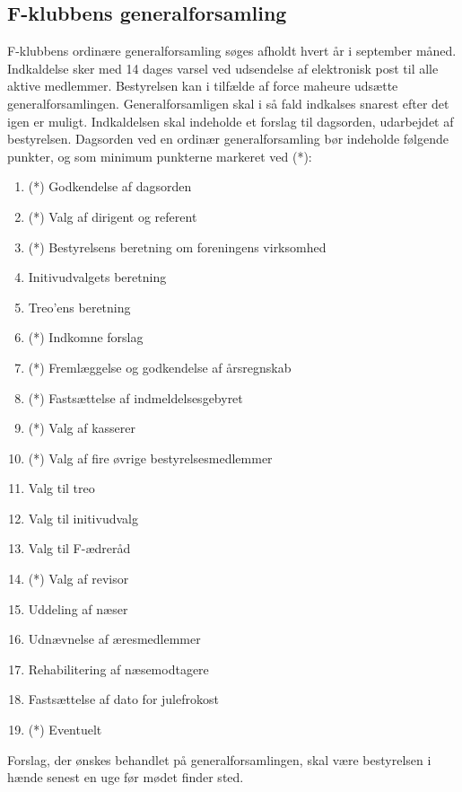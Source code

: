 \documentclass[a4paper,12pt,danish]{article}
\begin{document}
\begin{list}
\section{F-klubbens generalforsamling}

\item \label{par-gen} F-klubbens ordin{\ae}re generalforsamling
  s{\o}ges afholdt hvert {\aa}r i september m{\aa}ned. Indkaldelse sker med 14
  dages varsel ved udsendelse af elektronisk post til alle aktive
  medlemmer. Bestyrelsen kan i tilf{\ae}lde af force maheure uds{\ae}tte 
  generalforsamlingen. Generalforsamligen skal i s{\aa} fald indkalses 
  snarest efter det igen er muligt. Indkaldelsen skal indeholde et forslag til
  dagsorden, udarbejdet af bestyrelsen. Dagsorden ved en ordin{\ae}r
  generalforsamling b{\o}r indeholde f{\o}lgende punkter, og som minimum
punkterne markeret ved (*):

\begin{enumerate}
\item (*) Godkendelse af dagsorden
\item (*) Valg af dirigent og referent
\item (*) Bestyrelsens beretning om foreningens virksomhed
\item Initivudvalgets beretning
\item Treo'ens beretning
\item (*) Indkomne forslag
\item (*) Freml{\ae}ggelse og godkendelse af {\aa}rsregnskab
\item (*) Fasts{\ae}ttelse af indmeldelsesgebyret
\item (*) Valg af kasserer
\item (*) Valg af fire {\o}vrige bestyrelsesmedlemmer
\item Valg til treo
\item Valg til initivudvalg
\item Valg til F-{\ae}drer{\aa}d
\item (*) Valg af revisor
\item Uddeling af n{\ae}ser
\item Udn{\ae}vnelse af {\ae}resmedlemmer
\item Rehabilitering af n{\ae}semodtagere
\item Fasts{\ae}ttelse af dato for julefrokost
\item (*) Eventuelt
\end{enumerate}

Forslag, der {\o}nskes behandlet p{\aa} generalforsamlingen, skal
v{\ae}re bestyrelsen i h{\ae}nde senest en uge f{\o}r m{\o}det finder
  sted.
  

\end{list}
\end{document}
